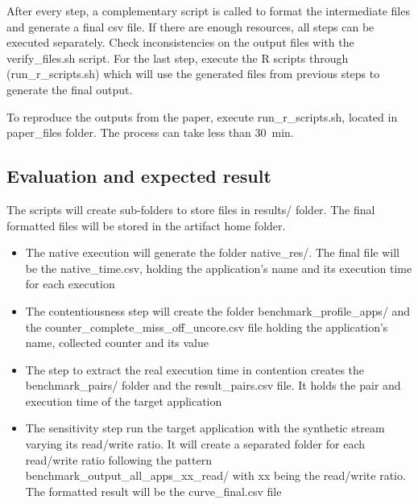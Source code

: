 \documentclass{sigplanconf}
\begin{document}
	After every step, a complementary script is called to format the intermediate files and
	generate a final csv file. If there are enough resources, all steps can be executed
	separately. Check inconsistencies on the output files with the \textsf{verify\_files.sh} script. For the last step,
	execute the R scripts through (\textsf{run\_r\_scripts.sh}) which will use the generated
	files from previous steps to generate the final output.
	
	To reproduce the outputs from the paper, execute \textsf{run\_r\_scripts.sh}, located in
	\textsf{paper\_files} folder. The process can take less than \SI{30}{\minute}. 
	
	\subsection{Evaluation and expected result} 
	
	The scripts will create sub-folders to store files in \textsf{results/} folder. The final formatted files will be stored in the artifact home folder.
	
	\begin{itemize}
		
		\item The native execution will generate the folder \textsf{native\_res/}. The final file will be the \textsf{native\_time.csv}, holding the application's name and its execution time for each execution
		
		\item The contentiousness step will create the folder
		\textsf{benchmark\_profile\_apps/} and the
		\textsf{counter\_complete\_miss\_off\_uncore.csv} file holding the application's
		name, collected counter and its value
		
		\item The step to extract the real execution time in contention creates the
		\textsf{benchmark\_pairs/} folder and the \textsf{result\_pairs.csv}
		file. It holds the pair and execution time of the target
		application
		
		\item The sensitivity step run the target application with the synthetic stream
		varying its read/write ratio. It will create a separated folder for each
		read/write ratio following the pattern
		\textsf{benchmark\_output\_all\_apps\_xx\_read/} with \textsf{xx} being the
		read/write ratio. The formatted result will be the \textsf{curve\_final.csv} file
		
	\end{itemize} 
	
\end{document}
